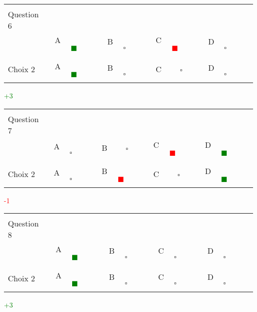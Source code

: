 \documentclass{book}%
\begin{document}
\thispagestyle{empty}%
\begin{center}%
\begin{tabular}{| l  l  l  l  l |}%
\hline%
 & & & & \\%
Question 6\qquad \qquad\ & & & & \\%
& A \textcolor{green}{$\qquad \blacksquare \qquad$}& B $\qquad \square \qquad$& C \textcolor{red}{$\qquad \blacksquare \qquad$}& D $\qquad \square \qquad$\\%
 & & & & \\%
\hline%
 & & & &  \\%
Choix 2& A \textcolor{green}{$\qquad \blacksquare \qquad$}& B $\qquad \square \qquad$& C $\qquad \square \qquad$& D $\qquad \square \qquad$\\%
 & & & &  \\%
\hline%
\end{tabular}%
 \qquad  \textcolor{green}{+3}%
\\ \vskip3mm%
\end{center}%
\thispagestyle{empty}%
\begin{center}%
\begin{tabular}{| l  l  l  l  l |}%
\hline%
 & & & & \\%
Question 7\qquad \qquad\ & & & & \\%
& A $\qquad \square \qquad$& B $\qquad \square \qquad$& C \textcolor{red}{$\qquad \blacksquare \qquad$}& D \textcolor{green}{$\qquad \blacksquare \qquad$}\\%
 & & & & \\%
\hline%
 & & & &  \\%
Choix 2& A $\qquad \square \qquad$& B \textcolor{red}{$\qquad \blacksquare \qquad$}& C $\qquad \square \qquad$& D \textcolor{green}{$\qquad \blacksquare \qquad$}\\%
 & & & &  \\%
\hline%
\end{tabular}%
 \qquad  \textcolor{red}{-1}%
\\ \vskip3mm%
\end{center}%
\thispagestyle{empty}%
\begin{center}%
\begin{tabular}{| l  l  l  l  l |}%
\hline%
 & & & & \\%
Question 8\qquad \qquad\ & & & & \\%
& A \textcolor{green}{$\qquad \blacksquare \qquad$}& B $\qquad \square \qquad$& C $\qquad \square \qquad$& D $\qquad \square \qquad$\\%
 & & & & \\%
\hline%
 & & & &  \\%
Choix 2& A \textcolor{green}{$\qquad \blacksquare \qquad$}& B $\qquad \square \qquad$& C $\qquad \square \qquad$& D $\qquad \square \qquad$\\%
 & & & &  \\%
\hline%
\end{tabular}%
 \qquad  \textcolor{green}{+3}%
\\ \vskip3mm%
\end{center}%
\end{document}

